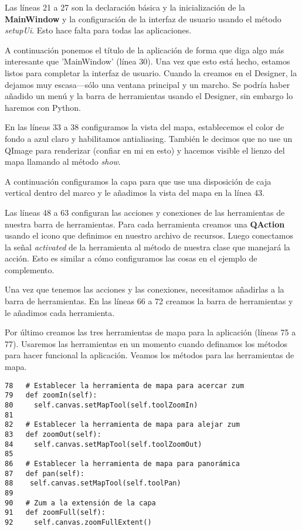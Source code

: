 Las líneas 21 a 27 son la declaración básica y la inicialización de la \textbf{MainWindow}
y la configuración de la interfaz de usuario usando el método \textsl{setupUi}. Esto hace
falta para todas las aplicaciones.

A continuación ponemos el título de la aplicación de forma que diga algo más interesante que 'MainWindow' 
(línea 30). Una vez que esto está hecho, estamos listos para completar la interfaz de usuario. Cuando la 
creamos en el Designer, la dejamos muy escasa---sólo una ventana principal y un marcho. Se podría haber añadido 
un menú y la barra de herramientas usando el Designer, sin embargo lo haremos con Python.

En las líneas 33 a 38 configuramos la vista del mapa, establecemos el color de fondo a azul claro y habilitamos 
antialiasing. También le decimos que no use un QImage para renderizar (confiar en mi en esto) y hacemos visible 
el lienzo del mapa llamando al método \textsl{show}.

A continuación configuramos la capa para que use una disposición de caja vertical dentro del marco y le 
añadimos la vista del mapa en la línea 43.

Las líneas 48 a 63 configuran las acciones y conexiones de las herramientas de nuestra barra de herramientas. 
Para cada herramienta creamos una \textbf{QAction} usando el icono que definimos en nuestro archivo de recursos. 
Luego conectamos la señal \textsl{activated} de la herramienta al método de nuestra clase que manejará la acción. 
Esto es similar a cómo configuramos las cosas en el ejemplo de complemento.

Una vez que tenemos las acciones y las conexiones, necesitamos añadirlas a la barra de herramientas. En las 
líneas 66 a 72 creamos la barra de herramientas y le añadimos cada herramienta.

Por último creamos las tres herramientas de mapa para la aplicación (líneas 75 a 77). Usaremos las herramientas en 
un momento cuando definamos los métodos para hacer funcional la aplicación. Veamos los métodos para las herramientas de mapa.

\begin{verbatim}
78   # Establecer la herramienta de mapa para acercar zum
79   def zoomIn(self):
80     self.canvas.setMapTool(self.toolZoomIn)
81 
82   # Establecer la herramienta de mapa para alejar zum
83   def zoomOut(self):
84     self.canvas.setMapTool(self.toolZoomOut)
85 
86   # Establecer la herramienta de mapa para panorámica 
87   def pan(self):
88    self.canvas.setMapTool(self.toolPan)
89 
90   # Zum a la extensión de la capa
91   def zoomFull(self):
92     self.canvas.zoomFullExtent()
\end{verbatim}

